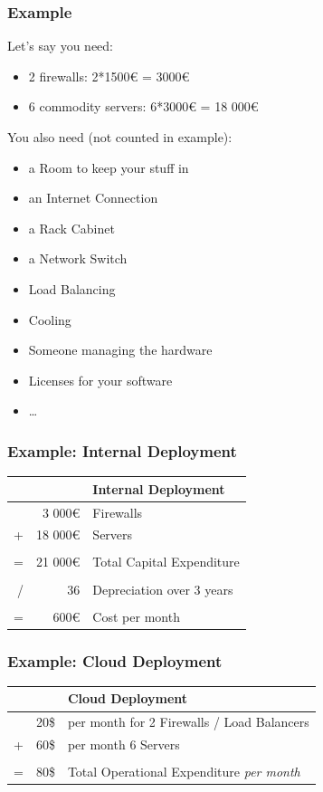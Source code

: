 \documentclass[10pt]{beamer}
\begin{document}
\begin{frame}[t]
\frametitle{Example}
Let's say you need:
\begin{itemize}
\item 2 firewalls: 2*1500€ = 3000€
\item 6 commodity servers: 6*3000€ = 18 000€
\end{itemize}

You also need (not counted in example):
\begin{itemize}
\item a Room to keep your stuff in
\item an Internet Connection
\item a Rack Cabinet
\item a Network Switch
\item Load Balancing
\item Cooling
\item Someone managing the hardware
\item Licenses for your software
\item \ldots
\end{itemize}

\end{frame}

\begin{frame}[t]
\frametitle{Example: Internal Deployment}
\begin{tabular}{rrl}
&& Internal Deployment\\
\hline
  &  3 000€ & Firewalls\\
+ & 18 000€ & Servers\\
\cline{2-2}\\
= & 21 000€ & Total Capital Expenditure\\
\cline{2-2}\\
/ &      36 & Depreciation over 3 years\\
\cline{2-3}\\
= &    600€ & Cost per month\\
\hline
\end{tabular}
\end{frame}

\begin{frame}[t]
\frametitle{Example: Cloud Deployment}
\begin{tabular}{rrl}
&& Cloud Deployment\\
\hline
  &  20\$ & per month for 2 Firewalls / Load Balancers\\
+ & 60\$ & per month 6 Servers\\
\cline{2-2}\\
= & 80\$ & Total Operational Expenditure \emph{per month}\\
\hline
\end{tabular}
\end{frame}
\end{document}
